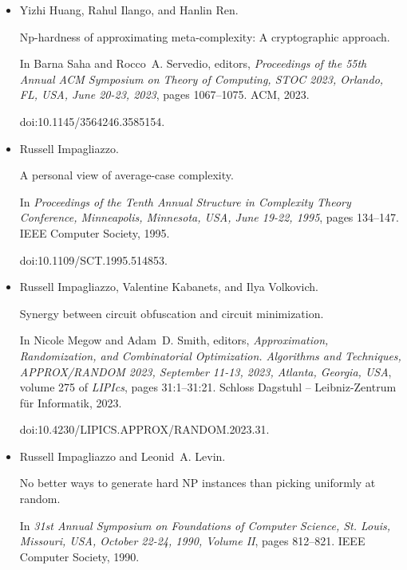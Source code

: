 \begin{itemize}
\item[] 
[21]

Yizhi Huang, Rahul Ilango, and Hanlin Ren.


Np-hardness of approximating meta-complexity: A cryptographic
approach.


In Barna Saha and Rocco A. Servedio, editors, \emph{Proceedings of the
55th Annual ACM Symposium on Theory of Computing, STOC 2023, Orlando, FL,
USA, June 20-23, 2023}, pages 1067–1075. ACM, 2023.


doi:10.1145/3564246.3585154.





\item[] 
[22]

Russell Impagliazzo.


A personal view of average-case complexity.


In \emph{Proceedings of the Tenth Annual Structure in Complexity
Theory Conference, Minneapolis, Minnesota, USA, June 19-22, 1995}, pages
134–147. IEEE Computer Society, 1995.


doi:10.1109/SCT.1995.514853.





\item[] 
[23]

Russell Impagliazzo, Valentine Kabanets, and Ilya Volkovich.


Synergy between circuit obfuscation and circuit minimization.


In Nicole Megow and Adam D. Smith, editors, \emph{Approximation,
Randomization, and Combinatorial Optimization. Algorithms and Techniques,
APPROX/RANDOM 2023, September 11-13, 2023, Atlanta, Georgia, USA}, volume
275 of \emph{LIPIcs}, pages 31:1–31:21. Schloss Dagstuhl – Leibniz-Zentrum
für Informatik, 2023.


doi:10.4230/LIPICS.APPROX/RANDOM.2023.31.





\item[] 
[24]

Russell Impagliazzo and Leonid A. Levin.


No better ways to generate hard NP instances than picking uniformly
at random.


In \emph{31st Annual Symposium on Foundations of Computer Science, St.
Louis, Missouri, USA, October 22-24, 1990, Volume II}, pages 812–821.
IEEE Computer Society, 1990.



\end{itemize}
